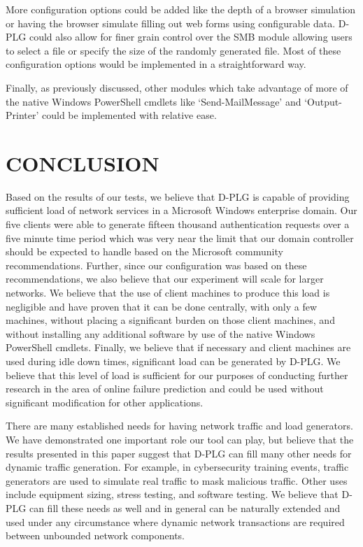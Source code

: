 More configuration options could be added like the depth of a browser
simulation or having the browser simulate filling out web forms using
configurable data.  D-PLG could also allow for finer grain control over the SMB
module allowing users to select a file or specify the size of the randomly
generated file.  Most of these configuration options would be implemented in a
straightforward way.

Finally, as previously discussed, other modules which take advantage of more of
the native Windows PowerShell cmdlets like `Send-MailMessage' and
`Output-Printer' could be implemented with relative ease.

\section{\uppercase{Conclusion}} \label{sec:conclusion}
\noindent Based on the results of our tests, we believe that D-PLG is capable
of providing sufficient load of network services in a Microsoft Windows
enterprise domain.  Our five clients were able to generate fifteen thousand
authentication requests over a five minute time period which was very near the
limit that our domain controller should be expected to  handle based on the
Microsoft community recommendations.  Further, since our configuration was
based on these recommendations, we also believe that our experiment will scale
for larger networks.  We believe that the use of client machines to produce
this load is negligible and have proven that it can be done centrally, with
only a few machines, without placing a significant burden on those client
machines, and without installing any additional software by use of the native
Windows PowerShell cmdlets.  Finally, we believe that if necessary and client
machines are used during idle down times, significant load can be generated by
D-PLG.  We believe that this level of load is sufficient for our purposes of
conducting further research in the area of online failure prediction and could
be used without significant modification for other applications.

There are many established needs for having network traffic and load
generators.  We have demonstrated one important role our tool can play, but
believe that the results presented in this paper suggest that D-PLG can fill
many other needs for dynamic traffic generation.  For example, in cybersecurity
training events, traffic generators are used to simulate real traffic to mask
malicious traffic.  Other uses include equipment sizing, stress testing, and
software testing.  We believe that D-PLG can fill these needs as well and in
general can be naturally extended and used under any circumstance where dynamic
network transactions are required between unbounded network components.
